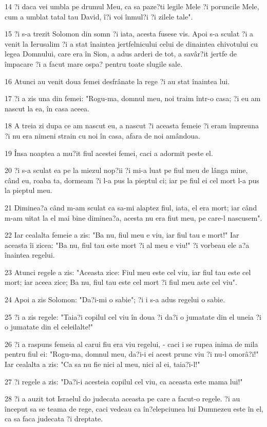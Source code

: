 \par 14 ?i daca vei umbla pe drumul Meu, ca sa paze?ti legile Mele ?i poruncile Mele, cum a umblat tatal tau David, î?i voi înmul?i ?i zilele tale".
\par 15 ?i s-a trezit Solomon din somn ?i iata, acesta fusese vis. Apoi s-a sculat ?i a venit la Ierusalim ?i a stat înaintea jertfelnicului celui de dinaintea chivotului cu legea Domnului, care era în Sion, a adus arderi de tot, a savâr?it jertfe de împacare ?i a facut mare ospa? pentru toate slugile sale.
\par 16 Atunci au venit doua femei desfrânate la rege ?i au stat înaintea lui.
\par 17 ?i a zis una din femei: "Rogu-ma, domnul meu, noi traim într-o casa; ?i eu am nascut la ea, în casa aceea.
\par 18 A treia zi dupa ce am nascut eu, a nascut ?i aceasta femeie ?i eram împreuna ?i nu era nimeni strain cu noi în casa, afara de noi amândoua.
\par 19 Însa noaptea a mu?it fiul acestei femei, caci a adormit peste el.
\par 20 ?i s-a sculat ea pe la miezul nop?ii ?i mi-a luat pe fiul meu de lânga mine, când eu, roaba ta, dormeam ?i l-a pus la pieptul ci; iar pe fiul ei cel mort l-a pus la pieptul meu.
\par 21 Diminea?a când m-am sculat ca sa-mi alaptez fiul, iata, el era mort; iar când m-am uitat la el mai bine diminea?a, acesta nu era fiut meu, pe care-l nascusem".
\par 22 Iar cealalta femeie a zis: "Ba nu, fiul meu e viu, iar fiul tau e mort!" Iar aceasta îi zicea: "Ba nu, fiul tau este mort ?i al meu e viu!" ?i vorbeau ele a?a înaintea regelui.
\par 23 Atunci regele a zis: "Aceasta zice: Fiul meu este cel viu, iar fiul tau este cel mort; iar aceea zice; Ba nu, fiul tau este cel mort ?i fiul meu aste cel viu".
\par 24 Apoi a zis Solomon: "Da?i-mi o sabie"; ?i i s-a adus regelui o sabie.
\par 25 ?i a zis regele: "Taia?i copilul cel viu în doua ?i da?i o jumatate din el uneia ?i o jumatate din el celeilalte!"
\par 26 ?i a raspuns femeia al carui fiu era viu regelui, - caci i se rupea inima de mila pentru fiul ei: "Rogu-ma, domnul meu, da?i-i ei acest prunc viu ?i nu-l omorâ?i!" Iar cealalta a zis: "Ca sa nu fie nici al meu, nici al ei, taia?i-l!"
\par 27 ?i regele a zis: "Da?i-i acesteia copilul cel viu, ca aceasta este mama lui!"
\par 28 ?i a auzit tot Israelul do judecata aceasta pe care a facut-o regele. ?i au început sa se teama de rege, caci vedeau ca în?elepciunea lui Dumnezeu este în el, ca sa faca judecata ?i dreptate.

